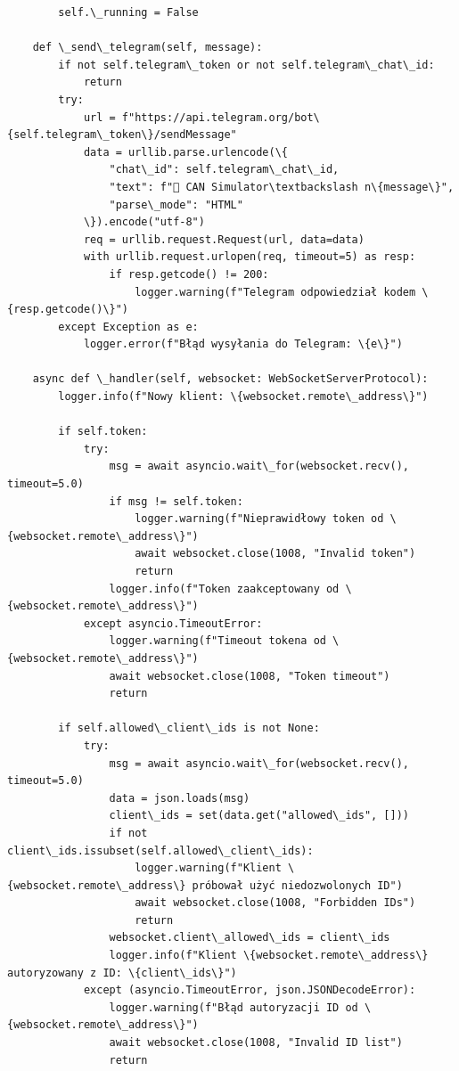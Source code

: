 \begin{lstlisting}
        self.\_running = False

    def \_send\_telegram(self, message):
        if not self.telegram\_token or not self.telegram\_chat\_id:
            return
        try:
            url = f"https://api.telegram.org/bot\{self.telegram\_token\}/sendMessage"
            data = urllib.parse.urlencode(\{
                "chat\_id": self.telegram\_chat\_id,
                "text": f"🚗 CAN Simulator\textbackslash n\{message\}",
                "parse\_mode": "HTML"
            \}).encode("utf-8")
            req = urllib.request.Request(url, data=data)
            with urllib.request.urlopen(req, timeout=5) as resp:
                if resp.getcode() != 200:
                    logger.warning(f"Telegram odpowiedział kodem \{resp.getcode()\}")
        except Exception as e:
            logger.error(f"Błąd wysyłania do Telegram: \{e\}")

    async def \_handler(self, websocket: WebSocketServerProtocol):
        logger.info(f"Nowy klient: \{websocket.remote\_address\}")

        if self.token:
            try:
                msg = await asyncio.wait\_for(websocket.recv(), timeout=5.0)
                if msg != self.token:
                    logger.warning(f"Nieprawidłowy token od \{websocket.remote\_address\}")
                    await websocket.close(1008, "Invalid token")
                    return
                logger.info(f"Token zaakceptowany od \{websocket.remote\_address\}")
            except asyncio.TimeoutError:
                logger.warning(f"Timeout tokena od \{websocket.remote\_address\}")
                await websocket.close(1008, "Token timeout")
                return

        if self.allowed\_client\_ids is not None:
            try:
                msg = await asyncio.wait\_for(websocket.recv(), timeout=5.0)
                data = json.loads(msg)
                client\_ids = set(data.get("allowed\_ids", []))
                if not client\_ids.issubset(self.allowed\_client\_ids):
                    logger.warning(f"Klient \{websocket.remote\_address\} próbował użyć niedozwolonych ID")
                    await websocket.close(1008, "Forbidden IDs")
                    return
                websocket.client\_allowed\_ids = client\_ids
                logger.info(f"Klient \{websocket.remote\_address\} autoryzowany z ID: \{client\_ids\}")
            except (asyncio.TimeoutError, json.JSONDecodeError):
                logger.warning(f"Błąd autoryzacji ID od \{websocket.remote\_address\}")
                await websocket.close(1008, "Invalid ID list")
                return


\end{lstlisting}
